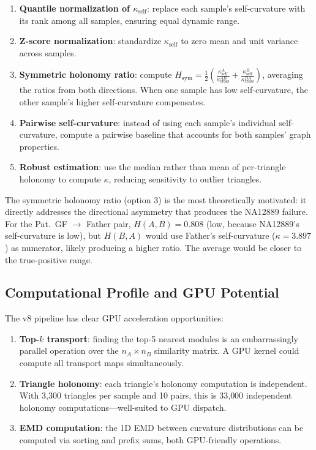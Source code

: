 \documentclass{../yalumba}
\begin{document}
\begin{enumerate}
  \item \textbf{Quantile normalization of $\kappa_{\text{self}}$}: replace
    each sample's self-curvature with its rank among all samples, ensuring
    equal dynamic range.
  \item \textbf{Z-score normalization}: standardize
    $\kappa_{\text{self}}$ to zero mean and unit variance across samples.
  \item \textbf{Symmetric holonomy ratio}: compute
    $H_{\text{sym}} = \frac{1}{2}\left(\frac{\kappa_{\text{self}}^A}
    {\kappa_{\text{cross}}^{AB}} + \frac{\kappa_{\text{self}}^B}
    {\kappa_{\text{cross}}^{BA}}\right)$,
    averaging the ratios from both directions.  When one sample has low
    self-curvature, the other sample's higher self-curvature compensates.
  \item \textbf{Pairwise self-curvature}: instead of using each sample's
    individual self-curvature, compute a pairwise baseline that accounts
    for both samples' graph properties.
  \item \textbf{Robust estimation}: use the median rather than mean of
    per-triangle holonomy to compute $\kappa$, reducing sensitivity to
    outlier triangles.
\end{enumerate}


The symmetric holonomy ratio (option 3) is the most theoretically motivated:
it directly addresses the directional asymmetry that produces the NA12889
failure.  For the Pat.~GF $\to$ Father pair, $H(A,B) = 0.808$ (low,
because NA12889's self-curvature is low), but $H(B,A)$ would use Father's
self-curvature ($\kappa = 3.897$) as numerator, likely producing a higher
ratio.  The average would be closer to the true-positive range.

\subsection{Computational Profile and GPU Potential}

The v8 pipeline has clear GPU acceleration opportunities:

\begin{enumerate}
  \item \textbf{Top-$k$ transport}: finding the top-5 nearest modules is
    an embarrassingly parallel operation over the $n_A \times n_B$ similarity
    matrix.  A GPU kernel could compute all transport maps simultaneously.
  \item \textbf{Triangle holonomy}: each triangle's holonomy computation is
    independent.  With 3{,}300 triangles per sample and 10 pairs, this is
    33{,}000 independent holonomy computations---well-suited to GPU dispatch.
  \item \textbf{EMD computation}: the 1D EMD between curvature distributions
    can be computed via sorting and prefix sums, both GPU-friendly operations.
\end{enumerate}
\end{document}
